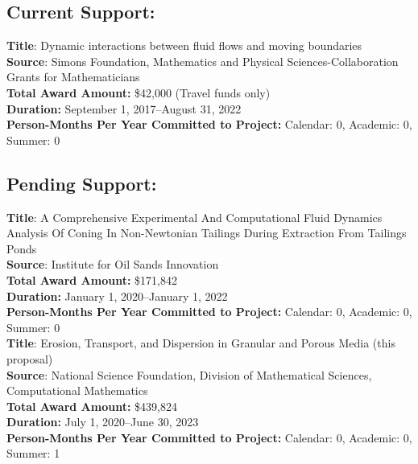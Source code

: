\documentclass[11pt]{article}
\begin{document}
\subsection*{Current Support:}

{\bf Title}: Dynamic interactions between fluid flows and moving boundaries \\
{\bf Source}: Simons Foundation, Mathematics and Physical
Sciences-Collaboration Grants for Mathematicians \\
{\bf Total Award Amount:} \$42,000 (Travel funds only) \\
{\bf Duration:} September 1, 2017--August 31, 2022 \\
{\bf Person-Months Per Year Committed to Project:} Calendar: 0,
Academic: 0, Summer: 0 \\


\subsection*{Pending Support:}

\noindent
{\bf Title}:  A Comprehensive Experimental And Computational Fluid Dynamics Analysis Of Coning In Non-Newtonian Tailings During Extraction From Tailings Ponds \\
{\bf Source}:  Institute for Oil Sands Innovation\\
{\bf Total Award Amount:} \$171,842 \\
{\bf Duration:}  January 1, 2020--January 1, 2022\\
{\bf Person-Months Per Year Committed to Project:} Calendar: 0,
Academic: 0, Summer: 0 \\

\noindent
{\bf Title}: Erosion, Transport, and Dispersion in Granular and Porous
Media (this proposal) \\
{\bf Source}: National Science Foundation, Division of Mathematical
Sciences, Computational Mathematics \\
{\bf Total Award Amount:} \$439,824 \\ %
{\bf Duration:} July 1, 2020--June 30, 2023 \\
{\bf Person-Months Per Year Committed to Project:} Calendar: 0,
Academic: 0, Summer: 1 \\
\end{document}
